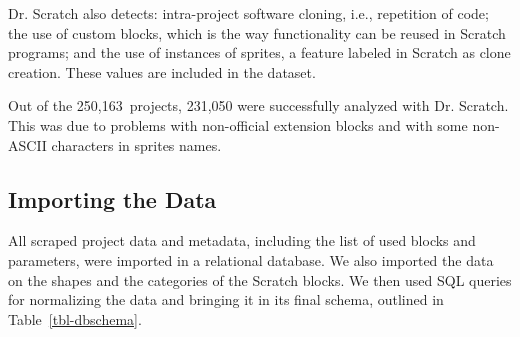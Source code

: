 \documentclass[10pt, conference]{IEEEtran}
\newcommand{\nPrograms}{250,163}
\begin{document}
Dr. Scratch also detects: intra-project software cloning, i.e., repetition of code; the use of custom blocks, which is the way functionality can be reused in Scratch programs; and the use of instances of sprites, a feature labeled in Scratch as clone creation. These values are included in the dataset.

Out of the \nPrograms~projects, 231,050 were successfully analyzed with Dr. Scratch. This was due to problems with non-official extension blocks and with some non-ASCII characters in sprites names.

\subsection{Importing the Data}
\label{dataAnalysis}
All scraped project data and metadata, including the list of used blocks and parameters, were imported in a relational database.
We also imported the data on the shapes and the categories of the Scratch blocks.
We then used SQL queries for normalizing the data and bringing it in its final schema, outlined in Table~\ref{tbl-dbschema}.
\end{document}
